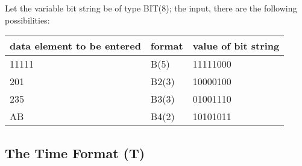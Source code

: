 Let the variable bit string be of type BIT(8); the input, there are the
following possibilities:

\begin{tabular}{lll}
data element to be entered & format & value of bit string \\ \hline
11111                      & B(5)   &         11111000    \\
201                        & B2(3)  &         10000100    \\
235                        & B3(3)  &         01001110    \\
AB                         & B4(2)  &         10101011
\end{tabular}

\subsection{The Time Format (T)}   %
\label{sec_dation_t_format}





